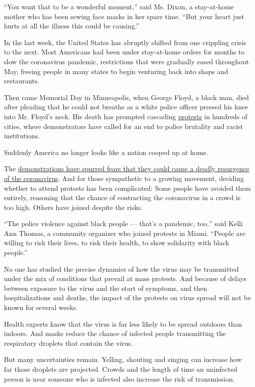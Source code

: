 ``You want that to be a wonderful moment,'' said Ms. Dixon, a
stay-at-home mother who has been sewing face masks in her spare time.
``But your heart just hurts at all the illness this could be causing.''

In the last week, the United States has abruptly shifted from one
crippling crisis to the next. Most Americans had been under stay-at-home
orders for months to slow the coronavirus pandemic, restrictions that
were gradually eased throughout May, freeing people in many states to
begin venturing back into shops and restaurants.

Then came Memorial Day in Minneapolis, when George Floyd, a black man,
died after pleading that he could not breathe as a white police officer
pressed his knee into Mr. Floyd's neck. His death has prompted cascading
\href{https://www.nytimes3xbfgragh.onion/2020/06/03/us/confederate-statues-george-floyd.html}{protests}
in hundreds of cities, where demonstrators have called for an end to
police brutality and racist institutions.

Suddenly America no longer looks like a nation cooped up at home.

The
\href{https://www.nytimes3xbfgragh.onion/2020/07/01/nyregion/nyc-coronavirus-protests.html}{demonstrations
have spurred fears that they could cause a deadly resurgence of the
coronavirus}. And for those sympathetic to a growing movement, deciding
whether to attend protests has been complicated: Some people have
avoided them entirely, reasoning that the chance of contracting the
coronavirus in a crowd is too high. Others have joined despite the
risks.

``The police violence against black people --- that's a pandemic, too,''
said Kelli Ann Thomas, a community organizer who joined protests in
Miami. ``People are willing to risk their lives, to risk their health,
to show solidarity with black people.''

No one has studied the precise dynamics of how the virus may be
transmitted under the mix of conditions that prevail at mass protests.
And because of delays between exposure to the virus and the start of
symptoms, and then hospitalizations and deaths, the impact of the
protests on virus spread will not be known for several weeks.

Health experts know that the virus is far less likely to be spread
outdoors than indoors. And masks reduce the chance of infected people
transmitting the respiratory droplets that contain the virus.

But many uncertainties remain. Yelling, shouting and singing can
increase how far those droplets are projected. Crowds and the length of
time an uninfected person is near someone who is infected also increase
the risk of transmission.

